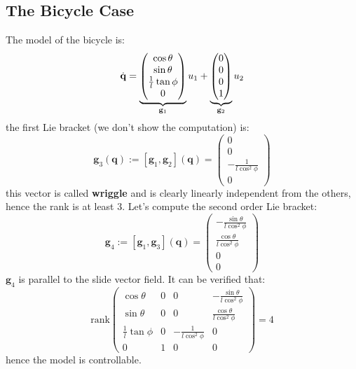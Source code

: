 \documentclass[10pt, a4paper]{report}
\newcommand{\q}{{\mathbf q}}
\begin{document}
\subsection{The Bicycle Case}
The model of the bicycle is:\begin{equation}
    {\dot{\mathbf q}}=
\underbrace{\begin{pmatrix}
        \cos\theta\\\sin\theta\\\frac{1}{l}\tan\phi\\0 
    \end{pmatrix}}_{\mathbf g_1}u_1+\underbrace{\begin{pmatrix}
        0\\0\\0\\1  
    \end{pmatrix}}_{\mathbf g_2}u_2
\end{equation}
the first Lie bracket (we don't show the computation) is:\begin{equation}
    \mathbf g_3(\q):=[\mathbf g_1,\mathbf g_2](\q)=\begin{pmatrix}
        0\\0\\-\frac{1}{l\cos^2\phi}\\0
    \end{pmatrix}
\end{equation}
this vector is called \textbf{wriggle} and is clearly linearly independent from the others, hence the rank is at least 3. Let's compute the second order Lie bracket:\begin{equation}
    \mathbf g_4:=[\mathbf g_1,\mathbf g_3](\q)=\begin{pmatrix}
        -\frac{\sin\theta}{l\cos^2\phi} 
        \\\frac{\cos\theta}{l\cos^2\phi} \\0\\0
    \end{pmatrix}
\end{equation}
$\mathbf g_4$ is parallel to the slide vector field.
It can be verified that:\begin{equation}
    \text{rank}\begin{pmatrix}
        \cos\theta&0&0& -\frac{\sin\theta}{l\cos^2\phi} \\
        \sin\theta&0&0&\frac{\cos\theta}{l\cos^2\phi}\\
        \frac{1}{l}\tan\phi&0&-\frac{1}{l\cos^2\phi}&0\\
        0&1&0&0
    \end{pmatrix}=4
\end{equation}
hence the model is controllable.
\end{document}
